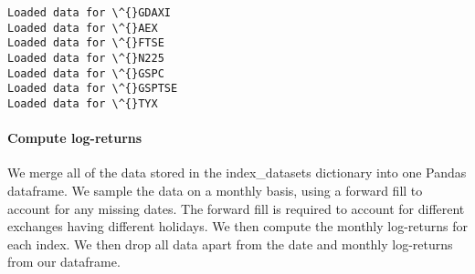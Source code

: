 \documentclass[11pt]{article}
\begin{document}
    \begin{Verbatim}[commandchars=\\\{\}]
Loaded data for \^{}GDAXI
Loaded data for \^{}AEX
Loaded data for \^{}FTSE
Loaded data for \^{}N225
Loaded data for \^{}GSPC
Loaded data for \^{}GSPTSE
Loaded data for \^{}TYX
    \end{Verbatim}

    \paragraph{Compute log-returns}\label{compute-log-returns}

We merge all of the data stored in the index\_datasets dictionary into
one Pandas dataframe. We sample the data on a monthly basis, using a
forward fill to account for any missing dates. The forward fill is
required to account for different exchanges having different holidays.
We then compute the monthly log-returns for each index. We then drop all
data apart from the date and monthly log-returns from our dataframe.
\end{document}

